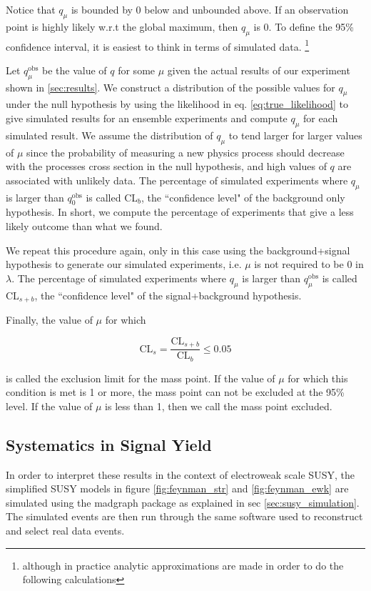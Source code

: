        Notice that $q_\mu$ is bounded by 0 below and unbounded above. If an observation point is highly likely w.r.t the global maximum, then $q_\mu$ is 0. To define the 95\% confidence interval, it is easiest to think in terms of simulated data. \footnote{ although in practice analytic approximations are made in order to do the following calculations} 

       Let $q^\text{obs}_\mu$ be the value of $q$ for some $\mu$ given the actual results of our experiment shown in \ref{sec:results}. We construct a distribution of the possible values for $q_\mu$ under the null hypothesis by using the likelihood in eq. \ref{eq:true_likelihood} to give simulated results for an ensemble experiments and compute $q_\mu$ for each simulated result. We assume the distribution of $q_\mu$ to tend larger for larger values of $\mu$ since the probability of measuring a new physics process should decrease with the processes cross section in the null hypothesis, and high values of $q$ are associated with unlikely data. The percentage of simulated experiments where $q_\mu$ is larger than $q^\text{obs}_0$ is called CL$_b$, the ``confidence level" of the background only hypothesis. In short, we compute the percentage of experiments that give a less likely outcome than what we found. 

       We repeat this procedure again, only in this case using the background+signal hypothesis to generate our simulated experiments, i.e. $\mu$ is not required to be 0 in $\lambda$. The percentage of simulated experiments where $q_\mu$ is larger than $q^\text{obs}_\mu$ is called CL$_{s+b}$, the ``confidence level" of the signal+background hypothesis. 

       Finally, the value of $\mu$ for which 

       \[
        \text{CL}_s = \frac{\text{CL}_{s+b}}{\text{CL}_b} \le 0.05
       \]

       is called the exclusion limit for the mass point. If the value of $\mu$ for which this condition is met is 1 or more, the mass point can not be excluded at the 95\% level. If the value of $\mu$ is less than 1, then we call the mass point excluded.


  \subsection{Systematics in Signal Yield} \label{sec:systematics_in_signal_yield}
    In order to interpret these results in the context of electroweak scale SUSY, the simplified SUSY models in figure \ref{fig:feynman_str} and \ref{fig:feynman_ewk} are simulated using the madgraph package as explained in sec \ref{sec:susy_simulation}. The simulated events are then run through the same software used to reconstruct and select real data events. 

